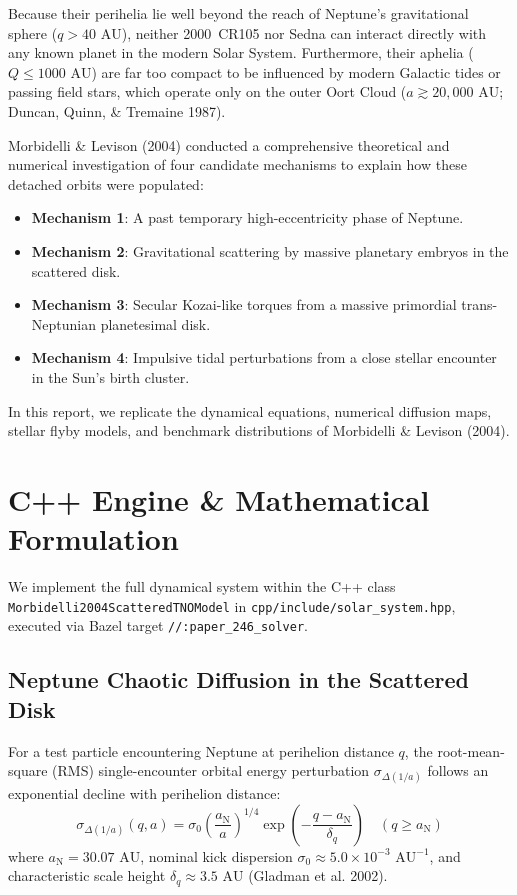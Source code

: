 \documentclass[11pt,a4paper]{article}
\begin{document}
Because their perihelia lie well beyond the reach of Neptune's gravitational sphere ($q > 40\text{ AU}$), neither 2000~CR105 nor Sedna can interact directly with any known planet in the modern Solar System. Furthermore, their aphelia ($Q \le 1000\text{ AU}$) are far too compact to be influenced by modern Galactic tides or passing field stars, which operate only on the outer Oort Cloud ($a \gtrsim 20{,}000\text{ AU}$; Duncan, Quinn, \& Tremaine 1987).

Morbidelli \& Levison (2004) conducted a comprehensive theoretical and numerical investigation of four candidate mechanisms to explain how these detached orbits were populated:
\begin{itemize}
    \item \textbf{Mechanism 1}: A past temporary high-eccentricity phase of Neptune.
    \item \textbf{Mechanism 2}: Gravitational scattering by massive planetary embryos in the scattered disk.
    \item \textbf{Mechanism 3}: Secular Kozai-like torques from a massive primordial trans-Neptunian planetesimal disk.
    \item \textbf{Mechanism 4}: Impulsive tidal perturbations from a close stellar encounter in the Sun's birth cluster.
\end{itemize}
In this report, we replicate the dynamical equations, numerical diffusion maps, stellar flyby models, and benchmark distributions of Morbidelli \& Levison (2004).

\section{C++ Engine \& Mathematical Formulation}
We implement the full dynamical system within the C++ class\\ \texttt{Morbidelli2004ScatteredTNOModel} in \texttt{cpp/include/solar\_system.hpp}, executed via Bazel target \texttt{//:paper\_246\_solver}.

\subsection{Neptune Chaotic Diffusion in the Scattered Disk}
For a test particle encountering Neptune at perihelion distance $q$, the root-mean-square (RMS) single-encounter orbital energy perturbation $\sigma_{\Delta(1/a)}$ follows an exponential decline with perihelion distance:
\begin{equation}
\sigma_{\Delta(1/a)}(q, a) = \sigma_0 \left(\frac{a_{\text{N}}}{a}\right)^{1/4} \exp\left(-\frac{q - a_{\text{N}}}{\delta_q}\right) \quad (q \ge a_{\text{N}})
\end{equation}
where $a_{\text{N}} = 30.07\text{ AU}$, nominal kick dispersion $\sigma_0 \approx 5.0 \times 10^{-3}\text{ AU}^{-1}$, and characteristic scale height $\delta_q \approx 3.5\text{ AU}$ (Gladman et al. 2002).
\end{document}
